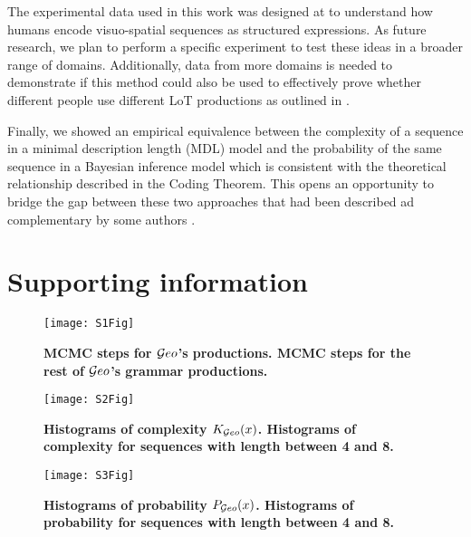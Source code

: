 The experimental data used in this work was designed at \cite{marie2016} to understand how humans encode visuo-spatial sequences as structured expressions. As future research, we plan to perform a specific experiment to test these ideas in a broader range of domains. Additionally, data from more domains is needed to demonstrate if this method could also be used to effectively prove whether different people use different LoT productions as outlined in .

Finally, we showed an empirical equivalence between the complexity of a sequence in a minimal description length (MDL) model and the probability of the same sequence in a Bayesian inference model which is consistent with the theoretical relationship described in the Coding Theorem. This opens an opportunity to bridge the gap between these two approaches that had been described ad complementary by some authors \cite{mackay2003information}.


\section{Supporting information}

\begin{figure}[htpb]
    \centering
    \texttt{[image: S1Fig]}
    \caption{\bf{MCMC steps for $\mathcal Geo$'s productions.} MCMC steps for the rest of $\mathcal Geo$'s grammar productions.}
    \label{S1_Fig}
\end{figure}

\begin{figure}[htpb]
    \centering
    \texttt{[image: S2Fig]}
    \caption{\bf{Histograms of complexity $K_{\mathcal Geo}(x)$}. Histograms of  complexity for sequences with length between 4 and 8.}
    \label{S2_Fig}
\end{figure}

\begin{figure}[htpb]
    \centering
    \texttt{[image: S3Fig]}
    \caption{\bf{Histograms of probability $P_{\mathcal Geo}(x)$}. Histograms of  probability for sequences with length between 4 and 8.}
    \label{S3_Fig}
\end{figure}
